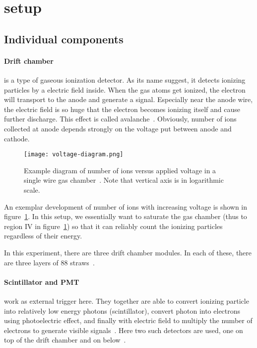 \section{setup}

\subsection{Individual components}
\paragraph{Drift chamber}
is a type of gaseous ionization detector. As its name suggest, it detects ionizing particles by a electric field inside. When the gas atoms get ionized, the electron will transport to the anode and generate a signal. Especially near the anode wire, the electric field is so huge that the electron becomes ionizing itself and cause further discharge. This effect is called avalanche~\cite{leo}. Obviously, number of ions collected at anode depends strongly on the voltage put between anode and cathode.

\begin{figure}[htpb]
	\centering
	\texttt{[image: voltage-diagram.png]}
	\caption{Example diagram of number of ions versus applied voltage in a single wire gas chamber~\cite{leo}. Note that vertical axis is in logarithmic scale. }%
	\label{fig:voltage-diagram}
\end{figure}
An exemplar development of number of ions with increasing voltage is shown in figure~\ref{fig:voltage-diagram}. In this setup, we essentially want to saturate the gas chamber (thus to region IV in figure~\ref{fig:voltage-diagram}) so that it can reliably count the ionizing particles regardless of their energy.

In this experiment, there are three drift chamber modules. In each of these, there are three layers of $88$ straws~\cite{manual}.

\paragraph{Scintillator and PMT}
work as external trigger here. They together are able to convert ionizing particle into relatively low energy photons (scintillator), convert photon into electrons using photoelectric effect, and finally with electric field to multiply the number of electrons to generate visible signals~\cite{wermes}. Here two such detectors are used, one on top of the drift chamber and on below~\cite{manual}.

